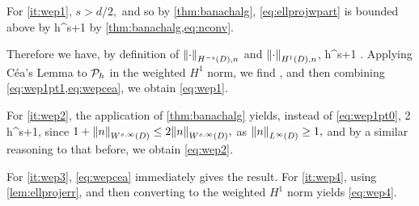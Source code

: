 For \cref{it:wep1}, $s > d/2,$ and so by \cref{thm:banachalg}, \cref{eq:ellprojwpart} is bounded above by
\beq\label{eq:wep1pt0}
     h^{s+1}
\eeq
by \cref{thm:banachalg,eq:nconv}.

Therefore we have, by definition of $\NHnfn{-s}{D}{\cdot}$ and $\NHoDn{\cdot}$,
\beq\label{eq:wep1pt1}
 \leq {}    h^{s+1} .
\eeq
Applying C\'ea's Lemma to $\mathcal P_{h}$ in the weighted $H^1$ norm, we find
\beq\label{eq:wepcea}
 \leq {},
\eeq
and then combining \cref{eq:wep1pt1,eq:wepcea}, we obtain \cref{eq:wep1}.

For \cref{it:wep2}, the application of \cref{thm:banachalg} yields, instead of \cref{eq:wep1pt0},
\beq\label{eq:wep2pt1}
2     h^{s+1},
\eeq
since $1 + \NWsiD{n} \leq 2\NWsiD{n},$ as $\NLiD{n} \geq 1,$ and by a similar reasoning to that before, we obtain \cref{eq:wep2}.

For \cref{it:wep3}, \cref{eq:wepcea} immediately gives the result. For \cref{it:wep4}, using \cref{lem:ellprojerr}, and then converting to the weighted $H^1$ norm yields \cref{eq:wep4}.
\epf




